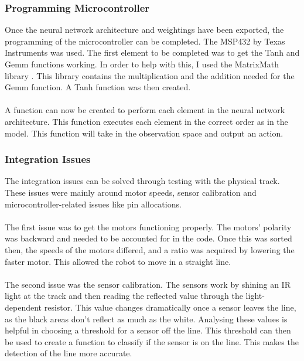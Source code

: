 \documentclass[a4paper,12pt]{article}
\begin{document}
\subsubsection{Programming Microcontroller}
Once the neural network architecture and weightings have been exported, the programming of the microcontroller can be completed. The MSP432 by Texas Instruments was used. The first element to be completed was to get the Tanh and Gemm functions working. In order to help with this, I used the MatrixMath library \cite{matrixmath}. This library contains the multiplication and the addition needed for the Gemm function. A Tanh function was then created. 
\\\\
A function can now be created to perform each element in the neural network architecture. This function executes each element in the correct order as in the model. This function will take in the observation space and output an action. 


\subsubsection{Integration Issues}

The integration issues can be solved through testing with the physical track. These issues were mainly around motor speeds, sensor calibration and microcontroller-related issues like pin allocations. 
\\\\
The first issue was to get the motors functioning properly. The motors' polarity was backward and needed to be accounted for in the code. Once this was sorted then, the speeds of the motors differed, and a ratio was acquired by lowering the faster motor. This allowed the robot to move in a straight line. 
\\\\
The second issue was the sensor calibration. The sensors work by shining an IR light at the track and then reading the reflected value through the light-dependent resistor. This value changes dramatically once a sensor leaves the line, as the black areas don't reflect as much as the white. Analysing these values is helpful in choosing a threshold for a sensor off the line. This threshold can then be used to create a function to classify if the sensor is on the line. This makes the detection of the line more accurate. 
\end{document}

